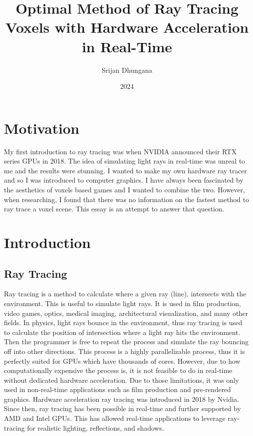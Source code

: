 \documentclass[12pt]{article}
\title{Optimal Method of Ray Tracing Voxels with Hardware Acceleration in Real-Time}
\author{Srijan Dhungana}
\date{2024}
\begin{document}
\maketitle
\clearpage

\tableofcontents
\clearpage

\section{Motivation}

My first introduction to ray tracing was when NVIDIA announced their RTX series GPUs in 2018.
The idea of simulating light rays in real-time was unreal to me and the results were stunning.
I wanted to make my own hardware ray tracer and so I was introduced to computer graphics.
I have always been fascinated by the aesthetics of voxels based games and I wanted to combine the two.
However, when researching, I found that there was no information on the fastest method to ray trace a voxel scene.
This essay is an attempt to answer that question.

\section{Introduction}

\subsection{Ray Tracing}

Ray tracing is a method to calculate where a given ray (line), intersects
with the environment. This is useful to simulate light rays. It is used in film
production, video games, optics, medical imaging, architectural visualization,
and many other fields. In physics, light rays bounce in the environment, thus
ray tracing is used to calculate the position of intersection where a light ray
hits the environment. Then the programmer is free to repeat the process
and simulate the ray bouncing off into other directions. This process is a
highly parallelizable process, thus it is perfectly suited for GPUs which have
thousands of cores. However, due to how computationally expensive the
process is, it is not feasible to do in real-time without dedicated hardware
acceleration. Due to those limitations, it was only used in non-real-time
applications such as film production and pre-rendered graphics. Hardware
acceleration ray tracing was introduced in 2018 by Nvidia. Since then, ray
tracing has been possible in real-time and further supported by AMD and
Intel GPUs. This has allowed real-time applications to leverage ray-tracing
for realistic lighting, reflections, and shadows.
\end{document}
